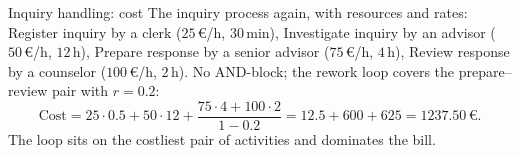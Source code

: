 \begin{examplebox}{Inquiry handling: cost}
The inquiry process again, with resources and rates: Register inquiry by a clerk ($25\,\euro$/h, $30$\,min), Investigate inquiry by an advisor ($50\,\euro$/h, $12$\,h), Prepare response by a senior advisor ($75\,\euro$/h, $4$\,h), Review response by a counselor ($100\,\euro$/h, $2$\,h). No AND-block; the rework loop covers the prepare--review pair with $r = 0.2$:
\[\text{Cost} = 25 \cdot 0.5 + 50 \cdot 12 + \frac{75 \cdot 4 + 100 \cdot 2}{1 - 0.2} = 12.5 + 600 + 625 = 1237.50\,\euro.\]
The loop sits on the costliest pair of activities and dominates the bill.
\end{examplebox}
